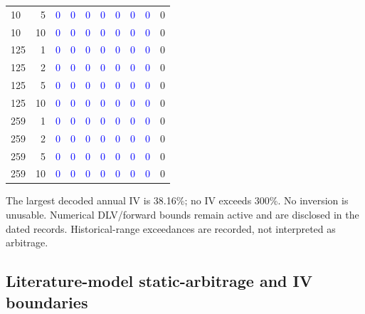 \documentclass[11pt]{article}
\begin{document}
\begin{table}[H]
\begin{tabular}{@{}lrrrrrrrrr@{}}
10 & 5 & \textcolor{blue}{0} & \textcolor{blue}{0} & \textcolor{blue}{0} & \textcolor{blue}{0} & \textcolor{blue}{0} & \textcolor{blue}{0} & \textcolor{blue}{0} & 0 \\
10 & 10 & \textcolor{blue}{0} & \textcolor{blue}{0} & \textcolor{blue}{0} & \textcolor{blue}{0} & \textcolor{blue}{0} & \textcolor{blue}{0} & \textcolor{blue}{0} & 0 \\
125 & 1 & \textcolor{blue}{0} & \textcolor{blue}{0} & \textcolor{blue}{0} & \textcolor{blue}{0} & \textcolor{blue}{0} & \textcolor{blue}{0} & \textcolor{blue}{0} & 0 \\
125 & 2 & \textcolor{blue}{0} & \textcolor{blue}{0} & \textcolor{blue}{0} & \textcolor{blue}{0} & \textcolor{blue}{0} & \textcolor{blue}{0} & \textcolor{blue}{0} & 0 \\
125 & 5 & \textcolor{blue}{0} & \textcolor{blue}{0} & \textcolor{blue}{0} & \textcolor{blue}{0} & \textcolor{blue}{0} & \textcolor{blue}{0} & \textcolor{blue}{0} & 0 \\
125 & 10 & \textcolor{blue}{0} & \textcolor{blue}{0} & \textcolor{blue}{0} & \textcolor{blue}{0} & \textcolor{blue}{0} & \textcolor{blue}{0} & \textcolor{blue}{0} & 0 \\
259 & 1 & \textcolor{blue}{0} & \textcolor{blue}{0} & \textcolor{blue}{0} & \textcolor{blue}{0} & \textcolor{blue}{0} & \textcolor{blue}{0} & \textcolor{blue}{0} & 0 \\
259 & 2 & \textcolor{blue}{0} & \textcolor{blue}{0} & \textcolor{blue}{0} & \textcolor{blue}{0} & \textcolor{blue}{0} & \textcolor{blue}{0} & \textcolor{blue}{0} & 0 \\
259 & 5 & \textcolor{blue}{0} & \textcolor{blue}{0} & \textcolor{blue}{0} & \textcolor{blue}{0} & \textcolor{blue}{0} & \textcolor{blue}{0} & \textcolor{blue}{0} & 0 \\
259 & 10 & \textcolor{blue}{0} & \textcolor{blue}{0} & \textcolor{blue}{0} & \textcolor{blue}{0} & \textcolor{blue}{0} & \textcolor{blue}{0} & \textcolor{blue}{0} & 0 \\
\bottomrule\end{tabular}\end{table}

The largest decoded annual IV is 38.16\%; no IV exceeds 300\%. No inversion is unusable. Numerical DLV/forward bounds remain active and are disclosed in the dated records. Historical-range exceedances are recorded, not interpreted as arbitrage.

\subsection{Literature-model static-arbitrage and IV boundaries}
\end{document}
